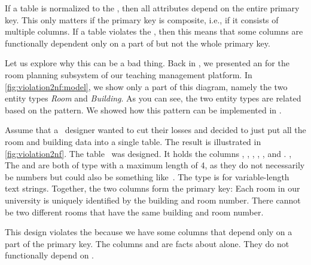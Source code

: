 %
%
%
%
%
If a table is normalized to the , then all attributes depend on the entire primary key.
This only matters if the primary key is composite, i.e., if it consists of multiple columns.
If a table violates the , then this means that some columns are functionally dependent only on a part of but not the whole primary key.

Let us explore why this can be a bad thing.
Back in , we presented an  for the room planning subsystem of our teaching management platform.
In \cref{fig:violation2nf:model}, we show only a part of this diagram, namely the two entity types \emph{Room} and \emph{Building}.
As you can see, the two entity types are related based on the  pattern.
We showed how this pattern can be implemented in .

Assume that a \db\ designer wanted to cut their losses and decided to just put all the room and building data into a single table.
The result is illustrated in \cref{fig:violation2nf}.
The table~ was designed.
It holds the columns , , , , , and .
, 
The  and  are both of type  with a maximum length of 4, as they do not necessarily be numbers but could also be something like~.
The type  is for variable-length text strings.
Together, the two columns form the primary key:
Each room in our university is uniquely identified by the building and room number.
There cannot be two different rooms that have the same building and room number.

This design violates the  because we have some columns that depend only on a part of the primary key.
The columns  and  are facts about  alone.
They do not functionally depend on .

